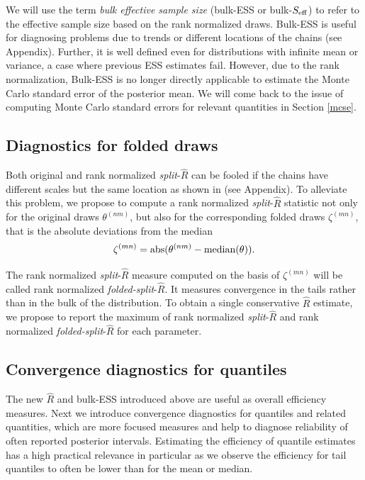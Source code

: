 \documentclass[american,]{article}
\begin{document}
We will use the term \emph{bulk effective sample size} (bulk-ESS or
bulk-\(S_{\rm eff}\)) to refer to the effective sample size based on the
rank normalized draws. Bulk-ESS is useful for diagnosing problems due to
trends or different locations of the chains (see Appendix). Further, it is
well defined even for distributions with infinite mean or variance, a
case where previous ESS estimates fail. However, due to the rank
normalization, Bulk-ESS is no longer directly applicable to estimate the
Monte Carlo standard error of the posterior mean. We will come back to
the issue of computing Monte Carlo standard errors for relevant
quantities in Section \ref{mcse}.

\hypertarget{diagnostics-for-folded-draws}{%
\subsection{Diagnostics for folded
draws}\label{diagnostics-for-folded-draws}}

Both original and rank normalized \emph{split}-\(\widehat{R}\) can be
fooled if the chains have different scales but the same location as
shown in (see Appendix). To alleviate this problem, we propose to compute a
rank normalized \emph{split}-\(\widehat{R}\) statistic not only for the
original draws \(\theta^{(nm)}\), but also for the corresponding folded
draws \(\zeta^{(mn)}\), that is the absolute deviations from the median
\begin{equation}
\label{zeta}
\zeta^{(mn)} = {\rm abs}(\theta^{(nm)}-{\rm median}(\theta)).
\end{equation}

The rank normalized \emph{split}-\(\widehat{R}\) measure computed on the
basis of \(\zeta^{(mn)}\) will be called rank normalized
\emph{folded-split}-\(\widehat{R}\). It measures convergence in the
tails rather than in the bulk of the distribution. To obtain a single
conservative \(\widehat{R}\) estimate, we propose to report the maximum
of rank normalized \emph{split}-\(\widehat{R}\) and rank normalized
\emph{folded-split}-\(\widehat{R}\) for each parameter.

\hypertarget{convergence-diagnostics-for-quantiles}{%
\subsection{Convergence diagnostics for
quantiles}\label{convergence-diagnostics-for-quantiles}}

The new \(\widehat{R}\) and bulk-ESS introduced above are useful as overall efficiency
measures. Next we introduce
convergence diagnostics for quantiles and related quantities, which are more focused measures and help to diagnose reliability of often reported
posterior intervals. Estimating
the efficiency of quantile estimates has a high practical
relevance in particular as we observe the efficiency for tail quantiles
to often be lower than for the mean or median.
\end{document}
